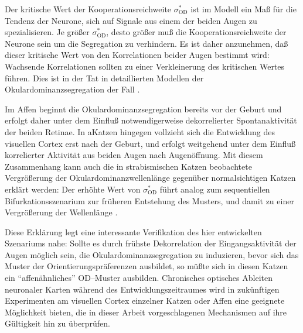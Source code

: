 Der kritische Wert der Kooperationsreichweite $\sigma^\ast_{\text{OD}}$ ist
im Modell ein Maß für die Tendenz der Neurone, sich auf Signale aus einem
der beiden Augen zu spezialisieren. Je größer $\sigma^\ast_{\text{OD}}$,
desto größer muß die Kooperationsreichweite der Neurone sein um die
Segregation zu verhindern. Es ist daher anzunehmen, daß dieser kritische
Wert von den Korrelationen beider Augen bestimmt wird: Wachsende
Korrelationen sollten zu einer Verkleinerung des kritischen Wertes führen.
Dies ist in der Tat in detaillierten Modellen der Okulardominanzsegregation
der Fall \cite{scherf:1994}.

Im Affen beginnt die Okulardominanzsegregation bereits vor der Geburt \cite{rakic:1981}
und erfolgt daher unter dem Einfluß notwendigerweise dekorrelierter Spontanaktivität der
beiden Retinae. In aKatzen hingegen vollzieht sich die Entwicklung des visuellen Cortex erst
nach der Geburt, und erfolgt weitgehend unter dem Einfluß korrelierter
Aktivität aus beiden Augen nach Augenöffnung. Mit diesem Zusammenhang
kann auch die in strabismischen Katzen beobachtete Vergrößerung der
Okulardominanzwellenlänge gegenüber normalsichtigen Katzen erklärt
werden: Der erhöhte Wert von $\sigma^\ast_{\text{OD}}$ führt analog zum
sequentiellen Bifurkationsszenarium zur früheren Entstehung des Musters,
und damit zu einer Vergrößerung der Wellenlänge
\parencite[siehe auch][]{scherf:1994}.

Diese Erklärung legt eine interessante Verifikation des hier entwickelten
Szenariums nahe: Sollte es durch frühste Dekorrelation der Eingangsaktivität
der Augen möglich sein, die Okulardominanzsegregation zu induzieren, bevor
sich das Muster der Orientierungspräferenzen ausbildet, so müßte sich in
diesen Katzen ein ``affenähnliches'' OD--Muster ausbilden. Chronisches
optisches Ableiten neuronaler Karten während des Entwicklungszeitraumes
wird in zukünftigen Experimenten am visuellen Cortex einzelner Katzen oder
Affen eine geeignete Möglichkeit bieten, die in dieser Arbeit
vorgeschlagenen Mechanismen auf ihre Gültigkeit hin zu überprüfen. \nocite{hoffsuemmer95a,hoffsuemmer96}

